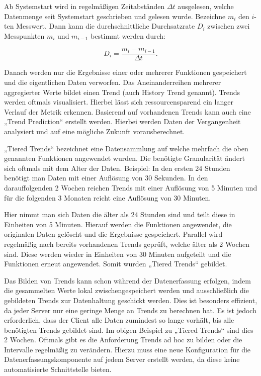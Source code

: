 {Ab Systemstart wird in regelmäßigen Zeitabständen $\Delta t$ ausgelesen, welche
Datenmenge seit Systemstart geschrieben und gelesen wurde. Bezeichne $m_i$ den
$i$-ten Messwert. Dann kann die durchschnittliche Durchsatzrate $D_i$ zwischen
zwei Messpunkten $m_i$ und $m_{i-1}$ bestimmt werden durch:

\[ D_i = \frac{m_{i} - m_{i-1}}{\Delta t}.\]

Danach werden nur die Ergebnisse einer oder mehrerer Funktionen gespeichert und
die eigentlichen Daten verworfen. Das Aneinanderreihen mehrerer aggregierter
Werte bildet einen Trend (auch History Trend genannt). Trends werden oftmals
visualisiert. Hierbei lässt sich ressourcensparend ein langer Verlauf der
Metrik erkennen. Basierend auf vorhandenen Trends kann auch eine „Trend
Prediction“ erstellt werden. Hierbei werden Daten der Vergangenheit analysiert
und auf eine mögliche Zukunft vorausberechnet.

„Tiered Trends“ bezeichnet eine Datensammlung auf welche mehrfach die oben
genannten Funktionen angewendet wurden. Die benötigte Granularität ändert sich
oftmals mit dem Alter der Daten. Beispiel: In den ersten 24 Stunden benötigt
man Daten mit einer Auflösung von 30 Sekunden. In den darauffolgenden 2 Wochen
reichen Trends mit einer Auflösung von 5 Minuten und für die folgenden 3
Monaten reicht eine Auflösung von 30 Minuten.

Hier nimmt man sich Daten die älter als 24 Stunden sind und teilt diese in
Einheiten von 5 Minuten. Hierauf werden die Funktionen angewendet, die
originalen Daten gelöscht und die Ergebnisse gespeichert. Parallel wird
regelmäßig nach bereits vorhandenen Trends geprüft, welche älter als 2 Wochen
sind. Diese werden wieder in Einheiten von 30 Minuten aufgeteilt und die
Funktionen erneut angewendet. Somit wurden „Tiered Trends“ gebildet.

Das Bilden von Trends kann schon während der Datenerfassung erfolgen, indem die
gesammelten Werte lokal zwischengespeichert werden und ausschließlich die
gebildeten Trends zur Datenhaltung geschickt werden. Dies ist besonders
effizient, da jeder Server nur eine geringe Menge an Trends zu berechnen hat.
Es ist jedoch erforderlich, dass der Client alle Daten zumindest so lange
vorhält, bis alle benötigten Trends gebildet sind. Im obigen Beispiel zu
„Tiered Trends“ sind dies 2 Wochen. Oftmals gibt es die Anforderung Trends ad
hoc zu bilden oder die Intervalle regelmäßig zu verändern. Hierzu muss eine
neue Konfiguration für die Datenerfassungskomponente auf jedem Server erstellt
werden, da diese keine automatisierte Schnittstelle bieten.

}
